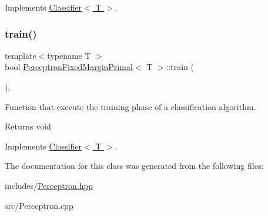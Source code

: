 Implements \hyperlink{class_classifier_ab3b9544a8d9c3cbde8d5865c7e9be0fb}{Classifier$<$ T $>$}.

\mbox{\label{class_perceptron_fixed_margin_primal_a6d4a14b9f39a4fef45de201edfeabce0}} 
\subsubsection{\texorpdfstring{train()}{train()}}
{\footnotesize\ttfamily template$<$typename T $>$ \\
bool \hyperlink{class_perceptron_fixed_margin_primal}{Perceptron\+Fixed\+Margin\+Primal}$<$ T $>$\+::train (\begin{DoxyParamCaption}{ }\end{DoxyParamCaption})\hspace{0.3cm}{\ttfamily [override]}, {\ttfamily [virtual]}}



Function that execute the training phase of a classification algorithm. 

\begin{DoxyReturn}{Returns}
void 
\end{DoxyReturn}


Implements \hyperlink{class_classifier_a120849bfdfa3ba7a0388b32b2d76bf4f}{Classifier$<$ T $>$}.



The documentation for this class was generated from the following files\+:\begin{DoxyCompactItemize}
\item 
includes/\hyperlink{_perceptron_8hpp}{Perceptron.\+hpp}\item 
src/Perceptron.\+cpp\end{DoxyCompactItemize}

